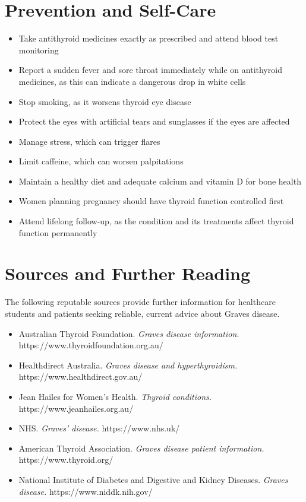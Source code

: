 \section*{Prevention and Self-Care}
\begin{itemize}
    \item Take antithyroid medicines exactly as prescribed and attend blood test monitoring
    \item Report a sudden fever and sore throat immediately while on antithyroid medicines, as this can indicate a dangerous drop in white cells
    \item Stop smoking, as it worsens thyroid eye disease
    \item Protect the eyes with artificial tears and sunglasses if the eyes are affected
    \item Manage stress, which can trigger flares
    \item Limit caffeine, which can worsen palpitations
    \item Maintain a healthy diet and adequate calcium and vitamin D for bone health
    \item Women planning pregnancy should have thyroid function controlled first
    \item Attend lifelong follow-up, as the condition and its treatments affect thyroid function permanently
\end{itemize}

\section*{Sources and Further Reading}
The following reputable sources provide further information for healthcare students and patients seeking reliable, current advice about Graves disease.

\begin{itemize}
    \item Australian Thyroid Foundation. \textit{Graves disease information.} https://www.thyroidfoundation.org.au/
    \item Healthdirect Australia. \textit{Graves disease and hyperthyroidism.} https://www.healthdirect.gov.au/
    \item Jean Hailes for Women's Health. \textit{Thyroid conditions.} https://www.jeanhailes.org.au/
    \item NHS. \textit{Graves' disease.} https://www.nhs.uk/
    \item American Thyroid Association. \textit{Graves disease patient information.} https://www.thyroid.org/
    \item National Institute of Diabetes and Digestive and Kidney Diseases. \textit{Graves disease.} https://www.niddk.nih.gov/
\end{itemize}
